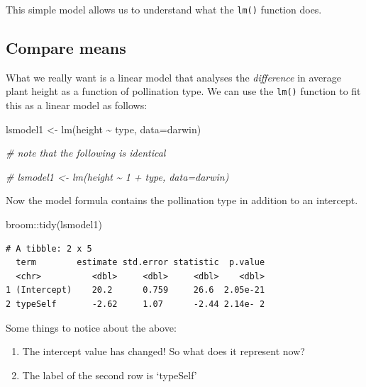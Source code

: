 \documentclass[
]{book}
\newenvironment{Shaded}{\begin{snugshade}}{\end{snugshade}}
\newcommand{\AttributeTok}[1]{\textcolor[rgb]{0.77,0.63,0.00}{#1}}
\newcommand{\CommentTok}[1]{\textcolor[rgb]{0.56,0.35,0.01}{\textit{#1}}}
\newcommand{\FunctionTok}[1]{\textcolor[rgb]{0.00,0.00,0.00}{#1}}
\newcommand{\NormalTok}[1]{#1}
\newcommand{\OtherTok}[1]{\textcolor[rgb]{0.56,0.35,0.01}{#1}}
\newcommand{\SpecialCharTok}[1]{\textcolor[rgb]{0.00,0.00,0.00}{#1}}
\begin{document}
This simple model allows us to understand what the \texttt{lm()} function does.

\hypertarget{compare-means}{%
\subsection{Compare means}\label{compare-means}}

What we really want is a linear model that analyses the \emph{difference} in average plant height as a function of pollination type. We can use the \texttt{lm()} function to fit this as a linear model as follows:

\begin{Shaded}
\begin{Highlighting}[]
\NormalTok{lsmodel1 }\OtherTok{\textless{}{-}} \FunctionTok{lm}\NormalTok{(height }\SpecialCharTok{\textasciitilde{}}\NormalTok{ type, }\AttributeTok{data=}\NormalTok{darwin)}

\CommentTok{\# note that the following is identical}

\CommentTok{\# lsmodel1 \textless{}{-} lm(height \textasciitilde{} 1 + type, data=darwin)}
\end{Highlighting}
\end{Shaded}

Now the model formula contains the pollination type in addition to an intercept.

\begin{Shaded}
\begin{Highlighting}[]
\NormalTok{broom}\SpecialCharTok{::}\FunctionTok{tidy}\NormalTok{(lsmodel1)}
\end{Highlighting}
\end{Shaded}

\begin{verbatim}
# A tibble: 2 x 5
  term        estimate std.error statistic  p.value
  <chr>          <dbl>     <dbl>     <dbl>    <dbl>
1 (Intercept)    20.2      0.759     26.6  2.05e-21
2 typeSelf       -2.62     1.07      -2.44 2.14e- 2
\end{verbatim}

Some things to notice about the above:

\begin{enumerate}
\def\labelenumi{\arabic{enumi})}
\item
  The intercept value has changed! So what does it represent now?
\item
  The label of the second row is `typeSelf'
\end{enumerate}
\end{document}
